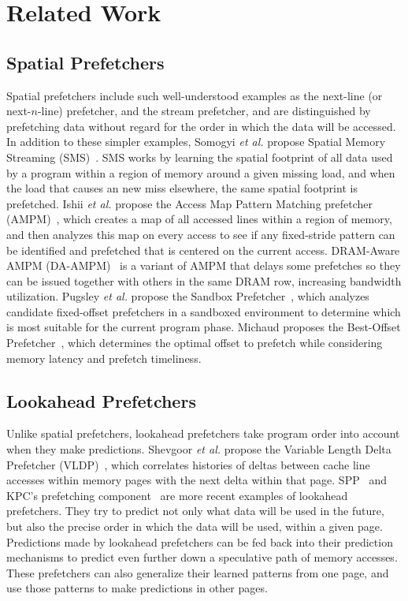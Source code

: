 \section{Related Work}
\label{related}

\subsection{Spatial Prefetchers}

Spatial prefetchers include such well-understood examples as the
next-line (or next-$n$-line) prefetcher, and the stream prefetcher,
and are distinguished by prefetching data without regard for the order
in which the data will be accessed.  In addition to these simpler
examples, Somogyi \textit{et al.}  propose Spatial Memory Streaming
(SMS)~\cite{SMS}.  SMS works by learning the spatial footprint of all
data used by a program within a region of memory around a given
missing load, and when the load that causes an new miss elsewhere, the
same spatial footprint is prefetched.  Ishii \textit{et al.} propose
the Access Map Pattern Matching prefetcher (AMPM)~\cite{AMPM}, which
creates a map of all accessed lines within a region of memory, and
then analyzes this map on every access to see if any fixed-stride
pattern can be identified and prefetched that is centered on the
current access. DRAM-Aware AMPM (DA-AMPM)~\cite{DA_AMPM} is a variant
of AMPM that delays some prefetches so they can be issued together
with others in the same DRAM row, increasing bandwidth utilization.
Pugsley \textit{et al.}  propose the Sandbox
Prefetcher~\cite{Sandbox}, which analyzes candidate fixed-offset
prefetchers in a sandboxed environment to determine which is most
suitable for the current program phase.  Michaud proposes the
Best-Offset Prefetcher~\cite{BOP}, which determines the optimal offset
to prefetch while considering memory latency and prefetch timeliness.

\subsection{Lookahead Prefetchers}

Unlike spatial prefetchers, lookahead prefetchers take program order
into account when they make predictions.  Shevgoor \textit{et al.}
propose the Variable Length Delta Prefetcher (VLDP)~\cite{VLDP}, which
correlates histories of deltas between cache line accesses within
memory pages with the next delta within that page. SPP~\cite{SPP} and
KPC's prefetching component~\cite{KPC} are more recent examples of
lookahead prefetchers. They try to predict not only what data will be
used in the future, but also the precise order in which the data will
be used, within a given page. Predictions made by lookahead
prefetchers can be fed back into their prediction mechanisms to
predict even further down a speculative path of memory accesses. These
prefetchers can also generalize their learned patterns from one page,
and use those patterns to make predictions in other pages.

